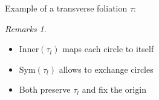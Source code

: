 \documentclass[hyperref={pdfpagelabels=false}]{beamer}
\theoremstyle{plain}
\theoremstyle{remark}
\newtheorem*{remark}{Remarks}
\begin{document}
{
\begin{frame}{Example of a transverse foliation $\tau$:}
\begin{minipage}[]{0.45\textwidth}
\begin{figure}
\end{figure}
\end{minipage}
\hfill
\begin{minipage}[]{0.45\textwidth}
\begin{remark}
\begin{itemize}
	\item $\mathup{Inner}(\tau_l)$ maps each circle to itself
	\item $\mathup{Sym}(\tau_l)$ allows to exchange circles
	\item Both preserve $\tau_l$ and fix the origin
\end{itemize}
\end{remark}
\end{minipage}
\end{frame}
}
\end{document}
